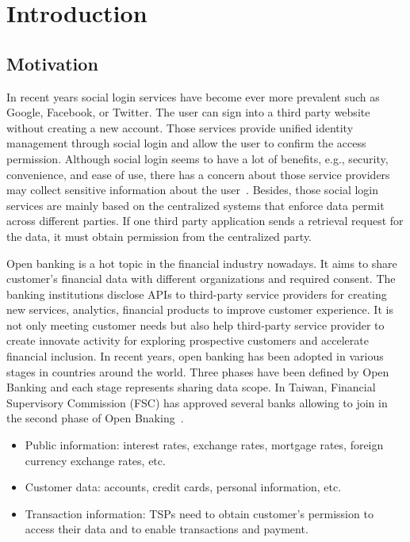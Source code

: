 \chapter{Introduction}
\label{chapter:intro}
\section{Motivation}
In recent years social login services have become ever more prevalent such as Google, Facebook, or Twitter. The user can sign into a third party website without creating a new account. Those services provide unified identity management through social login and allow the user to confirm the access permission. Although social login seems to have a lot of benefits, e.g., security, convenience, and ease of use, there has a concern about those service providers may collect sensitive information about the user~\cite{gafni2014social}.
Besides, those social login services are mainly based on the centralized systems that enforce data permit across different parties. If one third party application sends a retrieval request for the data, it must obtain permission from the centralized party.\par
Open banking is a hot topic in the financial industry nowadays. It aims to share customer's financial data with different organizations and required consent. The banking institutions disclose APIs to third-party service providers for creating new services, analytics, financial products to improve customer experience. It is not only meeting customer needs but also help third-party service provider to create innovate activity for exploring prospective customers and accelerate financial inclusion. In recent years, open banking has been adopted in various stages in countries around the world. Three phases have been defined by Open Banking and each stage represents sharing data scope. In Taiwan, Financial Supervisory Commission (FSC) has approved several banks allowing to join in the second phase of Open Bnaking~\cite{thepaypers_2021}.\par

\begin{itemize}
    \item Public information: interest rates, exchange rates, mortgage rates, foreign currency exchange rates, etc.
    \item Customer data: accounts, credit cards, personal information, etc.
    \item Transaction information: TSPs need to obtain customer's permission to access their data and to enable transactions and payment.
\end{itemize}\par


